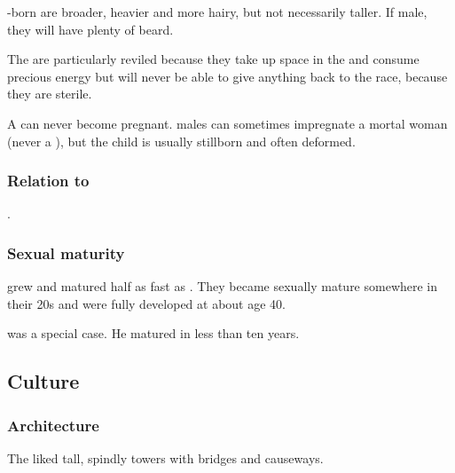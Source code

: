 \begin{gloss}
  \Nephil-born \resphain{} are broader, heavier and more hairy, but not necessarily taller. 
  If male, they will have plenty of beard. 
  
  The \bezedeth{} are particularly reviled because they take up space in the  and consume precious  energy but will never be able to give anything back to the \resphan{} race, because they are sterile. 
  
  A \bezed{} \resvil{} can never become pregnant. 
  \Bezed{} males can sometimes impregnate a mortal woman (never a \resvil), but the child is usually stillborn and often deformed. 
\end{gloss}





\subsubsection{Relation to \aryothim}
.





\subsubsection{Sexual maturity}
\Resphain grew and matured half as fast as \humans. 
They became sexually mature somewhere in their 20s and were fully developed at about age 40. 

\Thanatzil was a special case. 
He matured in less than ten years. 









\subsection{Culture}





\subsubsection{Architecture}
The \resphain{} liked tall, spindly towers with bridges and causeways. 

